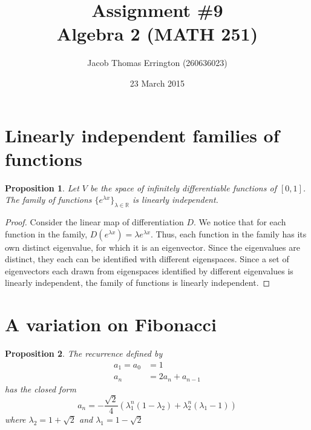 \documentclass{article}
\title{Assignment \#9\\Algebra 2 (MATH 251)}
\author{Jacob Thomas Errington (260636023)}
\date{23 March 2015}
\newtheorem{proposition}{Proposition}
\begin{document}
\maketitle

\section{Linearly independent families of functions}

\begin{proposition}
    Let $V$ be the space of infinitely differentiable functions of $[0, 1]$.
    The family of functions $\{e^{\lambda x}\}_{\lambda \in \mathbb{R}}$ is
    linearly independent.
\end{proposition}

\begin{proof}
    Consider the linear map of differentiation $D$.
    We notice that for each function in the family,
    $D(e^{\lambda x}) = \lambda e^{\lambda x}$. Thus, each function in the
    family has its own distinct eigenvalue, for which it is an eigenvector.
    Since the eigenvalues are distinct, they each can be identified with
    different eigenspaces. Since a set of eigenvectors each drawn from
    eigenspaces identified by different eigenvalues is linearly independent,
    the family of functions is linearly independent.
\end{proof}

\section{A variation on Fibonacci}

\begin{proposition}
    The recurrence defined by
    \begin{align*}
        a_1 = a_0 &= 1 \\
        a_n &= 2 a_n + a_{n-1}
    \end{align*}
    has the closed form
    \begin{equation*}
        a_n = - \frac{\sqrt{2}}{4}
            \left( \lambda_1^n (1 - \lambda_2) + \lambda_2^n (\lambda_1 - 1)\right)
    \end{equation*}
    where
    ${\lambda_2} = 1 + \sqrt{2}$ and ${\lambda_1} = 1 - \sqrt{2}$
\end{proposition}
\end{document}
